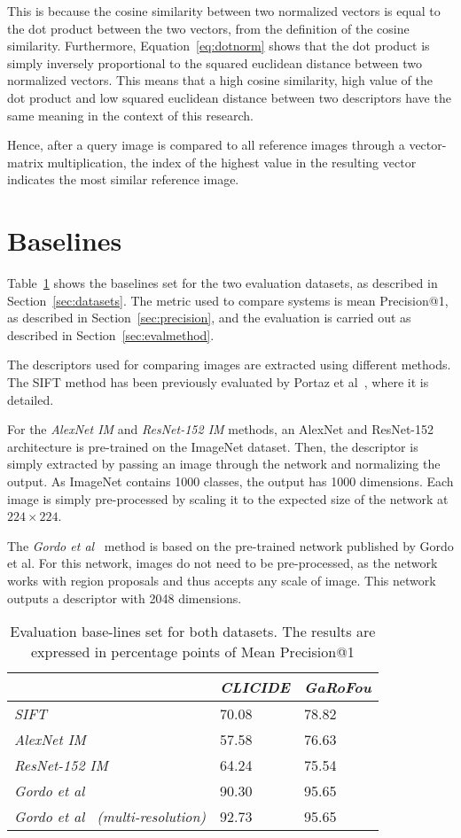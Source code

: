 This is because the cosine similarity between two normalized vectors is
equal to the dot product between the two vectors, from the definition
of the cosine similarity. Furthermore, Equation~\ref{eq:dotnorm} shows
that the dot product is simply inversely proportional to the squared
euclidean distance between two normalized vectors.
This means that a high cosine similarity, high value of the dot product
and low squared euclidean distance between two descriptors have the
same meaning in the context of this research.

Hence, after a query image is compared to all reference images through
a vector-matrix multiplication, the index of the highest value in the
resulting vector indicates the most similar reference image.

\section{Baselines}
Table~\ref{tab:baselines} shows the baselines set for the two evaluation
datasets, as described in Section~\ref{sec:datasets}. The metric used
to compare systems is mean Precision@1, as described in
Section~\ref{sec:precision}, and the evaluation is carried out as
described in Section~\ref{sec:evalmethod}.

The descriptors used for comparing images are extracted using different
methods.
The SIFT method has been previously evaluated by
Portaz et al~\cite{portaz_construction_nodate}, where it is detailed.

For the \emph{AlexNet IM} and \emph{ResNet-152 IM} methods,
an AlexNet and ResNet-152 architecture is pre-trained on the ImageNet dataset.
Then, the descriptor is simply extracted by passing an image through the
network and normalizing the output. As ImageNet contains 1000 classes, the
output has 1000 dimensions. Each image is simply pre-processed by scaling
it to the expected size of the network at $224 \times 224$.

The \emph{Gordo et al}~\cite{gordo_deep_2016} method is based on the
pre-trained network published by Gordo et al.
For this network, images do not need to
be pre-processed, as the network works with region proposals and thus accepts
any scale of image. This network outputs a descriptor with 2048 dimensions.

\begin{table}
\begin{tabular}{|*{3}{l|}}
\hline & \emph{CLICIDE} & \emph{GaRoFou}\\
\hline \emph{SIFT} & 70.08 & 78.82\\
\hline \emph{AlexNet IM} & 57.58 & 76.63\\
\hline \emph{ResNet-152 IM} & 64.24 & 75.54\\
\hline \emph{Gordo et al~\cite{gordo_deep_2016}} & 90.30 & 95.65\\
\hline \emph{Gordo et al~\cite{gordo_deep_2016} (multi-resolution)}
& 92.73 & 95.65\\
\hline
\end{tabular}
\caption{Evaluation base-lines set for both datasets. The results are
expressed in percentage points of Mean Precision@1\label{tab:baselines}}
\end{table}

